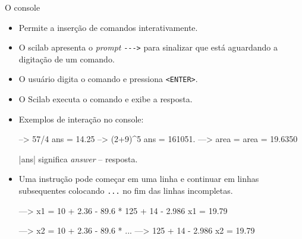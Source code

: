 \begin{frame}{O console}
  \begin{itemize}
    \item Permite a inserção de comandos interativamente.
    \item O scilab apresenta o \alert{\emph{prompt}} \verb|--->| para
    sinalizar que está aguardando a digitação de um comando.
    \item O usuário digita o comando e pressiona \verb|<ENTER>|.
    \item O Scilab executa o comando e exibe a resposta.
    \item Exemplos de interação no console:
    \begin{pygmented}[lang=text]
--> 57/4
 ans  =
    14.25
--> (2+9)^5
 ans  =
    161051.
---> area = %
 area =
    19.6350
    \end{pygmented}
    \pyginline|ans| significa \emph{answer} -- resposta.

    \framebreak
    
    \item Uma instrução pode começar em uma linha e continuar em linhas
    subsequentes colocando \verb|...| no fim das linhas incompletas.
    \begin{pygmented}[lang=text]
---> x1 = 10 + 2.36 - 89.6 * 125 + 14 - 2.986
 x1  =
    19.79

---> x2 = 10 + 2.36 - 89.6 * ...
--->      125 + 14 - 2.986
 x2  =
    19.79
    \end{pygmented}
  \end{itemize}
\end{frame}

